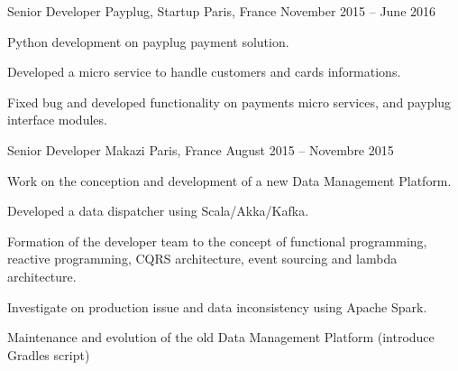 

\begin{cventries}

  \cventry
    {Senior Developer} %
    {Payplug, Startup} %
    {Paris, France} %
    {November 2015 – June 2016} %
    {
      \begin{cvitems} %
        \item {Python development on payplug payment solution.}
        \item {Developed a micro service to handle customers and cards informations.}
        \item {Fixed bug and developed functionality on payments micro services, and payplug interface modules.}
      \end{cvitems}
    }

  \cventry
    {Senior Developer} %
    {Makazi} %
    {Paris, France} %
    {August 2015 – Novembre 2015} %
    {
      \begin{cvitems} %
        \item {Work on the conception and development of a new Data Management Platform.}
        \item {Developed a data dispatcher using Scala/Akka/Kafka.}
        \item {Formation of the developer team to the concept of functional programming, reactive programming, CQRS architecture, event sourcing and lambda architecture.}
        \item {Investigate on production issue and data inconsistency using Apache Spark.}
        \item {Maintenance and evolution of the old Data Management Platform (introduce Gradles script)}
      \end{cvitems}
    }


\end{cventries}
